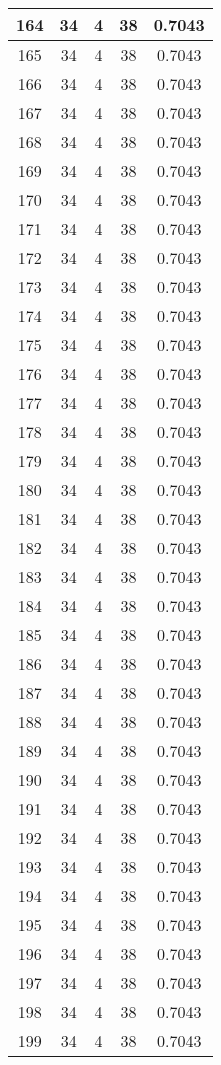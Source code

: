\documentclass[letterpaper, 12pt]{article}
\begin{document}
\begin{longtable}{|c|c|c|c|c|}
\hline
164 & 34 & 4 & 38 & 0.7043 \\
\hline
165 & 34 & 4 & 38 & 0.7043 \\
\hline
166 & 34 & 4 & 38 & 0.7043 \\
\hline
167 & 34 & 4 & 38 & 0.7043 \\
\hline
168 & 34 & 4 & 38 & 0.7043 \\
\hline
169 & 34 & 4 & 38 & 0.7043 \\
\hline
170 & 34 & 4 & 38 & 0.7043 \\
\hline
171 & 34 & 4 & 38 & 0.7043 \\
\hline
172 & 34 & 4 & 38 & 0.7043 \\
\hline
173 & 34 & 4 & 38 & 0.7043 \\
\hline
174 & 34 & 4 & 38 & 0.7043 \\
\hline
175 & 34 & 4 & 38 & 0.7043 \\
\hline
176 & 34 & 4 & 38 & 0.7043 \\
\hline
177 & 34 & 4 & 38 & 0.7043 \\
\hline
178 & 34 & 4 & 38 & 0.7043 \\
\hline
179 & 34 & 4 & 38 & 0.7043 \\
\hline
180 & 34 & 4 & 38 & 0.7043 \\
\hline
181 & 34 & 4 & 38 & 0.7043 \\
\hline
182 & 34 & 4 & 38 & 0.7043 \\
\hline
183 & 34 & 4 & 38 & 0.7043 \\
\hline
184 & 34 & 4 & 38 & 0.7043 \\
\hline
185 & 34 & 4 & 38 & 0.7043 \\
\hline
186 & 34 & 4 & 38 & 0.7043 \\
\hline
187 & 34 & 4 & 38 & 0.7043 \\
\hline
188 & 34 & 4 & 38 & 0.7043 \\
\hline
189 & 34 & 4 & 38 & 0.7043 \\
\hline
190 & 34 & 4 & 38 & 0.7043 \\
\hline
191 & 34 & 4 & 38 & 0.7043 \\
\hline
192 & 34 & 4 & 38 & 0.7043 \\
\hline
193 & 34 & 4 & 38 & 0.7043 \\
\hline
194 & 34 & 4 & 38 & 0.7043 \\
\hline
195 & 34 & 4 & 38 & 0.7043 \\
\hline
196 & 34 & 4 & 38 & 0.7043 \\
\hline
197 & 34 & 4 & 38 & 0.7043 \\
\hline
198 & 34 & 4 & 38 & 0.7043 \\
\hline
199 & 34 & 4 & 38 & 0.7043 \\
\hline
\end{longtable}
\end{document}
